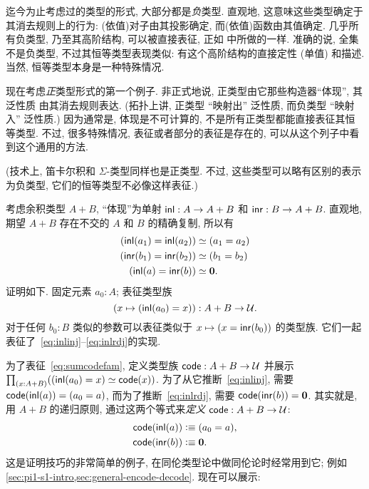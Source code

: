 %
%
迄今为止考虑过的类型的形式, 大部分都是\emph{负}类型.
%
%
直观地, 这意味这些类型确定于其消去规则上的行为: (依值)对子由其投影确定, 而(依值)函数由其值确定.
几乎所有负类型, 乃至其高阶结构, 可以被直接表征, 正如 中所做的一样.
准确的说, 全集不是负类型, 不过其恒等类型表现类似: 有这个高阶结构的直接定性 (单值) 和描述.
当然, 恒等类型本身是一种特殊情况.

现在考虑\emph{正}类型形式的第一个例子.
%
非正式地说, 正类型由它那些构造器``体现'', 其泛性质 由其消去规则表达.
(拓扑上讲, 正类型 ``映射出'' 泛性质, 而负类型 ``映射入'' 泛性质.)
因为通常是, 体现是不可计算的, 不是所有正类型都能直接表征其恒等类型.
不过, 很多特殊情况, 表征或者部分的表征是存在的, 可以从这个列子中看到这个通用的方法.

(技术上, 笛卡尔积和 $\Sigma$-类型同样也是正类型.
不过, 这些类型可以略有区别的表示为负类型, 它们的恒等类型不必像这样表征.)

考虑余积类型 $A+B$, ``体现''为单射 ${\mathsf{inl}}:A\to A+B$ 和 ${\mathsf{inr}}:B\to A+B$.
直观地, 期望 $A+B$ 存在不交的 $A$ 和 $B$ 的精确复制, 所以有
\begin{align}
{(\inl(a_1)=\inl(a_2))}
    &\eqvsym {(a_1=a_2)} \label{eq:inlinj}\\
    {(\inr(b_1)=\inr(b_2))}&\eqvsym {(b_1=b_2)}\\
    {(\inl(a)= \inr(b))} &\eqvsym {\emptyt}. \label{eq:inlrdj}
\end{align}
证明如下.
固定元素 $a_0:A$; 表征类型族
\begin{equation}
(x\mapsto (\inl(a_0)=x))
    : A+B \to \type.\label{eq:sumcodefam}
\end{equation}
对于任何 $b_0:B$ 类似的参数可以表征类似于 $x\mapsto (x = {\mathsf{inr}}(b_0))$ 的类型族.
它们一起表征了~\eqref{eq:inlinj}--\eqref{eq:inlrdj}的实现.

为了表征~\eqref{eq:sumcodefam}, 定义类型族 $\mathsf{code}:A+B\to\mathcal{U}$ 并展示 $\prd{x:A+B} (\eqv{(\inl(a_0)=x)}{\code(x)})$.
为了从它推断~\eqref{eq:inlinj}, 需要 $\mathsf{code}({\mathsf{inl}}(a)) = (a_0=a)$, 而为了推断~\eqref{eq:inlrdj}, 需要 $\mathsf{code} ({\mathsf{inr}}(b)) = \mathbf{0}$.
其实就是, 用 $A+B$ 的递归原则, 通过这两个等式来\emph{定义} $\mathsf{code}:A+B\to\mathcal{U}$:
\begin{align*}
    \mathsf{code}({\mathsf{inl}}(a)) &\vcentcolon\equiv (a_0=a),\\
    \mathsf{code}({\mathsf{inr}}(b)) &\vcentcolon\equiv \mathbf{0}.
\end{align*}
这是证明技巧的非常简单的例子, 在同伦类型论中做同伦论时经常用到它;
例如 \cref{sec:pi1-s1-intro,sec:general-encode-decode}.
%
现在可以展示:

